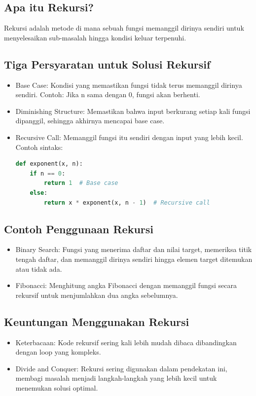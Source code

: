 \documentclass{article}
\begin{document}
\subsection{Apa itu Rekursi?}
Rekursi adalah metode di mana sebuah fungsi memanggil dirinya sendiri untuk menyelesaikan sub-masalah hingga kondisi keluar terpenuhi.

\subsection{Tiga Persyaratan untuk Solusi Rekursif}
\begin{itemize}
    \item Base Case: Kondisi yang memastikan fungsi tidak terus memanggil dirinya sendiri. Contoh: Jika n sama dengan 0, fungsi akan berhenti.
    \item Diminishing Structure: Memastikan bahwa input berkurang setiap kali fungsi dipanggil, sehingga akhirnya mencapai base case.
    \item Recursive Call: Memanggil fungsi itu sendiri dengan input yang lebih kecil. Contoh sintaks:
          \begin{lstlisting}[language=Python, caption={}, captionpos=b]
def exponent(x, n):
    if n == 0:
        return 1  # Base case
    else:
        return x * exponent(x, n - 1)  # Recursive call
\end{lstlisting}
\end{itemize}

\subsection{Contoh Penggunaan Rekursi}
\begin{itemize}
    \item Binary Search: Fungsi yang menerima daftar dan nilai target, memeriksa titik tengah daftar, dan memanggil dirinya sendiri hingga elemen target ditemukan atau tidak ada.
    \item Fibonacci: Menghitung angka Fibonacci dengan memanggil fungsi secara rekursif untuk menjumlahkan dua angka sebelumnya.
\end{itemize}

\subsection{Keuntungan Menggunakan Rekursi}
\begin{itemize}
    \item Keterbacaan: Kode rekursif sering kali lebih mudah dibaca dibandingkan dengan loop yang kompleks.
    \item Divide and Conquer: Rekursi sering digunakan dalam pendekatan ini, membagi masalah menjadi langkah-langkah yang lebih kecil untuk menemukan solusi optimal.
\end{itemize}
\end{document}
